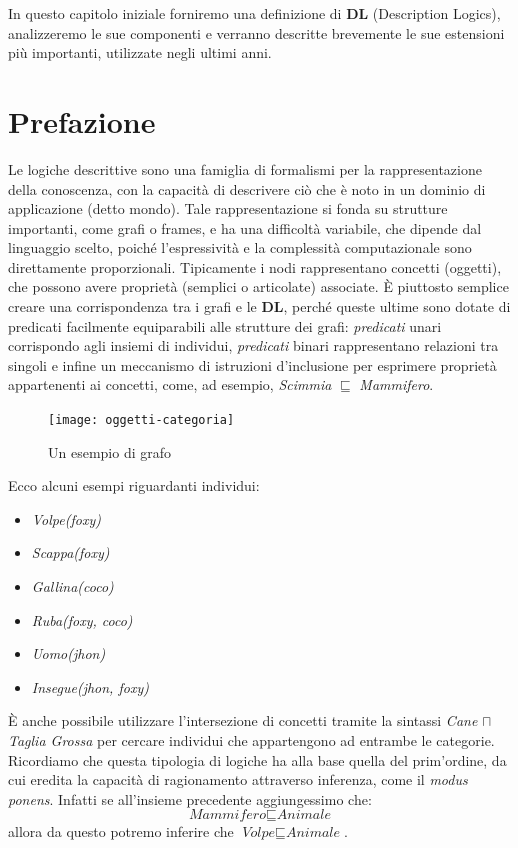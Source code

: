 In questo capitolo iniziale forniremo una definizione di \textbf{DL} (Description Logics), analizzeremo le sue componenti e verranno descritte brevemente le sue estensioni più importanti, utilizzate negli ultimi anni.
\section{Prefazione}
Le logiche descrittive sono una famiglia di formalismi per la rappresentazione
della conoscenza, con la capacità di descrivere ciò che è noto in un dominio di
applicazione (detto mondo). Tale rappresentazione si fonda su strutture importanti,
come grafi o frames, e ha una difficoltà variabile, che dipende dal linguaggio scelto,
poiché l'espressività e la complessità computazionale sono direttamente proporzionali.
Tipicamente i nodi rappresentano concetti (oggetti), che possono
avere proprietà (semplici o articolate) associate. È piuttosto
semplice creare una corrispondenza tra i grafi e le \textbf{DL},
perché queste ultime sono dotate di predicati facilmente equiparabili alle strutture dei grafi:
\textit{predicati} unari corrispondo agli insiemi di individui, 
\textit{predicati} binari rappresentano relazioni tra singoli e infine un meccanismo di istruzioni 
d'inclusione per esprimere proprietà appartenenti ai concetti, come, ad esempio, \textit{Scimmia }$\sqsubseteq$\textit{ Mammifero}.

\begin{figure}[ht]
	\texttt{[image: oggetti-categoria]}
	\centering
	\caption{Un esempio di grafo}
\end{figure}

Ecco alcuni esempi riguardanti individui:
\begin{itemize}
	\item \textit{Volpe(foxy)}
	\item \textit{Scappa(foxy)}
	\item \textit{Gallina(coco)}
	\item \textit{Ruba(foxy, coco)}
	\item \textit{Uomo(jhon)}
	\item \textit{Insegue(jhon, foxy)}
\end{itemize}

È anche possibile utilizzare l’intersezione di concetti tramite la sintassi 
\textit{Cane} $\sqcap$ \textit{Taglia Grossa} per cercare individui che 
appartengono ad entrambe le categorie. \\
Ricordiamo che questa tipologia di logiche 
ha alla base quella del prim'ordine, da cui eredita la capacità di 
ragionamento attraverso inferenza, come il \textit{modus ponens}.
Infatti se all'insieme precedente aggiungessimo che:
\[\textit{Mammifero} \sqsubseteq \textit{Animale}\]
allora da questo potremo inferire che $\textit{Volpe}\sqsubseteq\textit{Animale}$.

